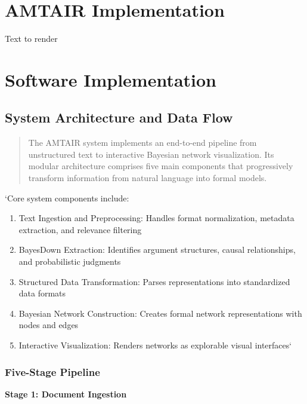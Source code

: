 \documentclass[
  11pt,
  letterpaper,
]{book}
\providecommand{\tightlist}{%
  \setlength{\itemsep}{0pt}\setlength{\parskip}{0pt}}
\begin{document}
\section{AMTAIR Implementation}\label{sec-amtair-implementation}

Text to render

\section{Software Implementation}\label{sec-software-implementation}

\subsection{System Architecture and Data
Flow}\label{sec-system-architecture}

\begin{quote}
The AMTAIR system implements an end-to-end pipeline from unstructured
text to interactive Bayesian network visualization. Its modular
architecture comprises five main components that progressively transform
information from natural language into formal models.
\end{quote}

`Core system components include:

\begin{enumerate}
\def\labelenumi{\arabic{enumi}.}
\tightlist
\item
  Text Ingestion and Preprocessing: Handles format normalization,
  metadata extraction, and relevance filtering
\item
  BayesDown Extraction: Identifies argument structures, causal
  relationships, and probabilistic judgments
\item
  Structured Data Transformation: Parses representations into
  standardized data formats
\item
  Bayesian Network Construction: Creates formal network representations
  with nodes and edges
\item
  Interactive Visualization: Renders networks as explorable visual
  interfaces`
\end{enumerate}

\subsubsection{Five-Stage Pipeline}\label{sec-five-stage-pipeline}

\textbf{Stage 1: Document Ingestion}
\end{document}
